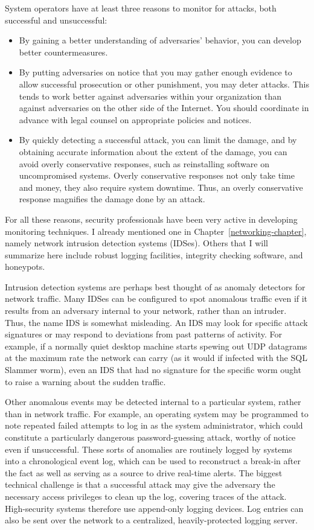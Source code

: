 System operators have at least three reasons to monitor for attacks,
both successful and unsuccessful:
\begin{itemize}
\item
By gaining a better understanding of adversaries' behavior, you can
develop better countermeasures.
\item
By putting adversaries on notice that you may gather enough evidence
to allow successful prosecution or other punishment, you may deter
attacks.  This tends to work better against adversaries within your
organization than against adversaries on the other side of the
Internet.  You should coordinate in advance with legal counsel on
appropriate policies and notices.
\item
By quickly detecting a successful attack, you can limit the damage, and
by obtaining accurate information about the extent of the damage, you
can avoid overly conservative responses, such as reinstalling software
on uncompromised systems.  Overly conservative responses not only take
time and money, they also require system downtime.  Thus, an overly
conservative response magnifies the damage done by an attack.
\end{itemize}

For all these reasons, security professionals have been very active in
developing monitoring techniques.  I already mentioned one in
Chapter~\ref{networking-chapter}, namely network intrusion detection
systems (IDSes).  Others that I will summarize here include robust
logging facilities, integrity checking software, and honeypots.

Intrusion detection systems are perhaps best thought of as anomaly
detectors for network traffic.  Many IDSes can be configured to spot
anomalous traffic even if it results from an adversary internal to
your network, rather than an intruder.  Thus, the name IDS is somewhat
misleading.  An IDS may look for specific attack signatures or may
respond to deviations from past patterns of activity.  For example, if
a normally quiet desktop machine starts spewing out UDP datagrams at the
maximum rate the network can carry (as it would if infected with the
SQL Slammer worm), even an IDS that had no signature for the specific
worm ought to raise a warning about the sudden traffic.

Other anomalous events may be detected internal to a particular
system, rather than in network traffic.  For example, an operating
system may be programmed to note repeated failed attempts to log in as
the system administrator, which could constitute a particularly
dangerous password-guessing attack, worthy of notice even if
unsuccessful.  These sorts of anomalies are routinely logged by systems
into a chronological event log, which can be used to reconstruct a
break-in after the fact as well as serving as a source to drive
real-time alerts.  The biggest technical challenge is that a
successful attack may give the adversary the necessary access privileges
to clean up the log, covering traces of the attack.  High-security
systems therefore use append-only logging devices.  Log entries can
also be sent over the network to a centralized, heavily-protected
logging server.

